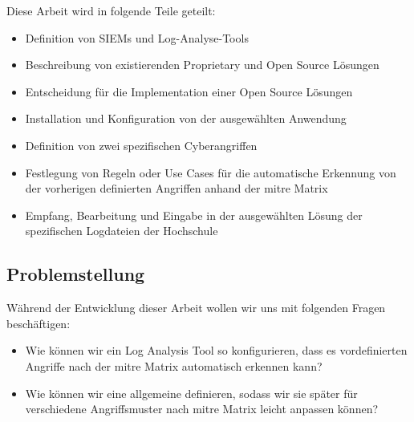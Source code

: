 Diese Arbeit wird in folgende Teile geteilt: 





{
\begin{itemize}[noitemsep]
   \item	Definition von SIEMs und Log-Analyse-Tools 
   \item	Beschreibung von existierenden Proprietary und Open Source Lösungen 
   \item	Entscheidung für die Implementation einer Open Source Lösungen 
   \item	Installation und Konfiguration von der ausgewählten Anwendung 
   \item	Definition von zwei spezifischen Cyberangriffen 
   \item	Festlegung von Regeln oder Use Cases für die automatische Erkennung von der vorherigen definierten Angriffen anhand der \gls{mitre} Matrix 
   \item	Empfang, Bearbeitung und Eingabe in der ausgewählten Lösung der spezifischen Logdateien der Hochschule 
\end{itemize}
}

\subsection{Problemstellung}
Während der Entwicklung dieser Arbeit wollen wir uns mit folgenden Fragen beschäftigen: 

{
\begin{itemize}[noitemsep]
   \item Wie können wir ein Log Analysis Tool so konfigurieren, dass es vordefinierten Angriffe nach der \gls{mitre} Matrix automatisch erkennen kann? 
   \item Wie können wir eine allgemeine  definieren, sodass wir sie später für verschiedene Angriffsmuster nach \gls{mitre} Matrix leicht anpassen können?
\end{itemize}
}

